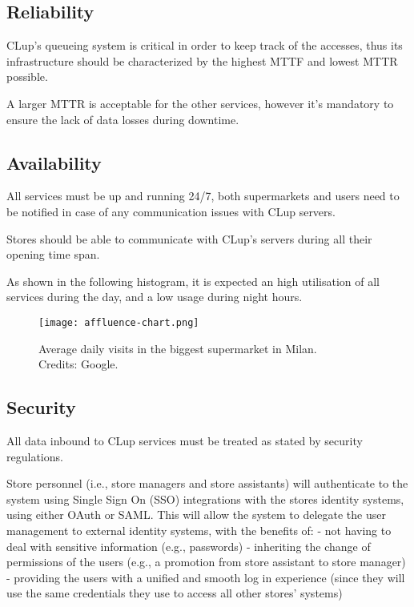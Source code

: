 \documentclass[../../main.tex]{subfiles}
\begin{document}
	\subsection{Reliability}

	CLup's queueing system is critical in order to keep track of the accesses, thus its infrastructure 
	should be characterized by the highest MTTF and lowest MTTR possible.

	A larger MTTR is acceptable for the other services, however it's mandatory to ensure the lack of 
	data losses during downtime.

	\subsection{Availability}

	All services must be up and running 24/7, both supermarkets and users need to be notified in case of 
	any communication issues with CLup servers.

	Stores should be able to communicate with CLup's servers during all their opening time span.

	As shown in the following histogram, it is expected an high utilisation of all services during the day, 
	and a low usage during night hours.

	\begin{figure}[H]
	    \centering
	    \texttt{[image: affluence-chart.png]}
	    \caption{Average daily visits in the biggest supermarket in Milan. \\Credits: Google.}
  	\end{figure}

	\subsection{Security}

	All data inbound to CLup services must be treated as stated by security regulations. 

	Store personnel (i.e., store managers and store assistants) will authenticate to the system using Single Sign On (SSO) integrations with the stores identity systems, using either OAuth or SAML. This will allow the system to delegate the user management to external identity systems, with the benefits of:
	- not having to deal with sensitive information (e.g., passwords)
	- inheriting the change of permissions of the users (e.g., a promotion from store assistant to store manager)
	- providing the users with a unified and smooth log in experience (since they will use the same credentials they use to access all other stores' systems)
\end{document}
